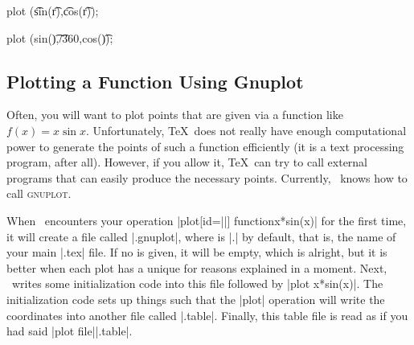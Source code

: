 \begin{codeexample}[]
\end{codeexample}

\begin{codeexample}[]
\tikz \draw[scale=0.5,domain=-3.141:3.141,smooth,variable=\t]
  plot ({\t*sin(\t r)},{\t*cos(\t r)});
\end{codeexample}

\begin{codeexample}[]
\tikz \draw[domain=0:360,smooth,variable=\t]
  plot ({sin(\t)},\t/360,{cos(\t)});
\end{codeexample}


\subsection{Plotting a Function Using Gnuplot}
\label{section-tikz-gnuplot}

Often, you will want to plot points that are given via a function like
$f(x) = x \sin x$. Unfortunately, \TeX\ does not really have enough
computational power to generate the points of such a function
efficiently (it is a text processing program, after all). However,
if you allow it, \TeX\ can try to call external programs that can
easily produce the necessary points. Currently, \tikzname\ knows how to
call \textsc{gnuplot}.

When \tikzname\ encounters your operation
|plot[id=||] function{x*sin(x)}| for
the first time, it will create a file called
|.gnuplot|, where  is |\jobname.| by
default, that is, the name of your main |.tex| file. If no  is
given, it will be empty, which is alright, but it is better when each
plot has a unique  for reasons explained in a moment. Next,
\tikzname\ writes some initialization code into this file followed by
|plot x*sin(x)|. The initialization code sets up things
such that the |plot| operation will write the coordinates into another
file called |.table|. Finally, this table file
is read as if you had said |plot file{||.table}|.

